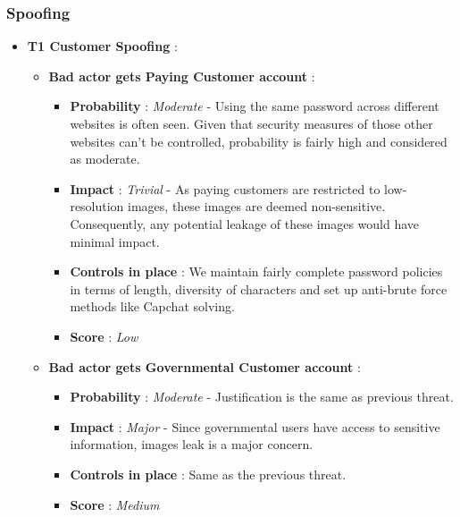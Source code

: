 \documentclass[12pt]{article}
\begin{document}
\subsubsection*{Spoofing}
\begin{itemize}
    \item \textbf{ T1 Customer Spoofing }:
        \begin{itemize}
            \item  \textbf{ Bad actor gets Paying Customer account }:

            \begin{itemize}
                \item  \textbf{ Probability }: \textit{Moderate} - Using the same password across different websites is often seen. Given that security measures of those other websites can't be controlled, probability is fairly high and considered as moderate.
                \item  \textbf{ Impact }: \textit{Trivial} - As paying customers are restricted to low-resolution images, these images are deemed non-sensitive. Consequently, any potential leakage of these images would have minimal impact.
                \item \textbf{ Controls in place }: We maintain fairly complete password policies in terms of length, diversity of characters and set up anti-brute force methods like Capchat solving.
                \item \textbf{ Score } : \textit{Low}
            \end{itemize}
            
            \item  \textbf{ Bad actor gets Governmental Customer account }:
            \begin{itemize}
                \item  \textbf{ Probability }: \textit{Moderate} - Justification is the same as previous threat.
                \item  \textbf{ Impact }:  \textit{Major} - Since governmental users have access to sensitive information, images leak is a major concern.
                \item \textbf{ Controls in place }: Same as the previous threat.
                \item \textbf{ Score } : \textit{Medium}
            \end{itemize}
        \end{itemize}
    

\end{itemize}
\end{document}
